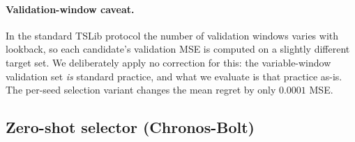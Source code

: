 \begin{table}[t]
\caption{PACF/AIC classical order selection: channel-median orders on level and first-differenced train series, mapped to the lookback grid, against the measured best lookback. PACF's significant lags extend to the 2880 cap on all eight datasets (a known long tail for strongly periodic series), so it always proposes 2880; AIC orders carry structure but measure only short-range linear predictability.}
\label{tab:pacf_aic}
\centering\footnotesize
{}
\end{table}

\paragraph{Validation-window caveat.} In the standard TSLib protocol the number of validation windows varies with lookback, so each candidate's validation MSE is computed on a slightly different target set. We deliberately apply no correction for this: the variable-window validation set \emph{is} standard practice, and what we evaluate is that practice as-is. The per-seed selection variant changes the mean regret by only $0.0001$ MSE.

\subsection{Zero-shot selector (Chronos-Bolt)}

